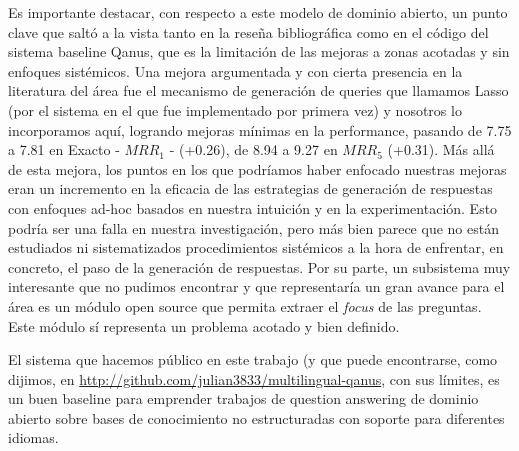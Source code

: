 Es importante destacar, con respecto a este modelo de dominio abierto, un punto clave que saltó a la vista tanto en la reseña bibliográfica como en el código del sistema baseline Qanus, que es la limitación de las mejoras a zonas acotadas y sin enfoques sistémicos. Una mejora argumentada y con cierta presencia en la literatura del área fue el mecanismo de generación de queries que llamamos Lasso (por el sistema en el que fue implementado por primera vez) y nosotros lo incorporamos aquí, logrando mejoras mínimas en la performance, pasando de 7.75 a 7.81 en Exacto - $MRR_1$ - (+0.26), de 8.94 a 9.27 en $MRR_5$ (+0.31). Más allá de esta mejora, los puntos en los que podríamos haber enfocado nuestras mejoras eran un incremento en la eficacia de las estrategias de generación de respuestas con enfoques ad-hoc basados en nuestra intuición y en la experimentación. Esto podría ser una falla en nuestra investigación, pero más bien parece que no están estudiados ni sistematizados procedimientos sistémicos a la hora de enfrentar, en concreto, el paso de la generación de respuestas. Por su parte, un subsistema muy interesante que no pudimos encontrar y que representaría un gran avance para el área es un módulo open source que permita extraer el \textit{focus} de las preguntas. Este módulo sí representa un problema acotado y bien definido.

El sistema que hacemos público en este trabajo (y que puede encontrarse, como dijimos, en \url{http://github.com/julian3833/multilingual-qanus}, con sus límites, es un buen baseline para emprender trabajos de question answering de dominio abierto sobre bases de conocimiento no estructuradas con soporte para diferentes idiomas.

